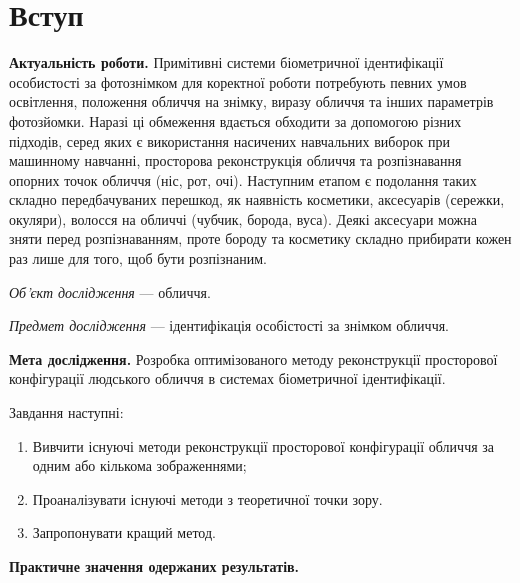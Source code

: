 \chapter*{Вступ}

\textbf{Актуальність роботи.}
Примітивні системи біометричної ідентифікації особистості за фотознімком
для коректної роботи потребують певних умов
освітлення, положення обличчя на знімку, виразу обличчя
та інших параметрів фотозйомки.
Наразі ці обмеження вдається обходити за допомогою різних підходів,
серед яких є
використання насичених навчальних виборок при машинному навчанні,
просторова реконструкція обличчя та
розпізнавання опорних точок обличчя (ніс, рот, очі).
Наступним етапом є подолання таких складно передбачуваних перешкод,
як наявність косметики, аксесуарів (сережки, окуляри),
волосся на обличчі (чубчик, борода, вуса).
Деякі аксесуари можна зняти перед розпізнаванням,
проте бороду та косметику складно прибирати кожен раз лише для того,
щоб бути розпізнаним.

\textit{Об’єкт дослідження} --- обличчя.

\textit{Предмет дослідження} --- ідентифікація особістості за знімком обличчя.

\textbf{Мета дослідження.}
Розробка оптимізованого методу реконструкції просторової конфігурації
людського обличчя в системах біометричної ідентифікації.

Завдання наступні:
\begin{enumerate}
  \item
    Вивчити існуючі методи реконструкції просторової конфігурації обличчя
    за одним або кількома зображеннями;
  \item
    Проаналізувати існуючі методи з теоретичної точки зору.
  \item
    Запропонувати кращий метод.
\end{enumerate}

\textbf{Практичне значення одержаних результатів.}
